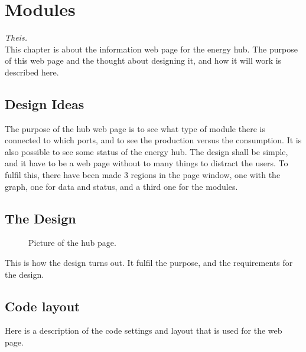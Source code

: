 \newpage
\chapter{Modules}\textit{Theis.}\\
This chapter is about the information web page for the energy hub. The purpose of this web page and the thought about designing it, and how it will work is described here.
\section{Design Ideas}
The purpose of the hub web page is to see what type of module there is connected to which ports, and to see the production versus the consumption. It is also possible to see some status of the energy hub. The design shall be simple, and it have to be a web page without to many things to distract the users. To fulfil this, there have been made 3 regions in the page window, one with the graph, one for data and status, and a third one for the modules.
\section{The Design}

\begin{figure}[h!]
	\center
		\setlength\fboxsep{0pt}
		\setlength\fboxrule{1pt}
   	\caption{Picture of the hub page.}
   	\label{fig:hub_page_design}
\end{figure}
This is how the design turns out. It fulfil the purpose, and the requirements for the design.
\section{Code layout}
Here is a description of the code settings and layout that is used for the web page.

